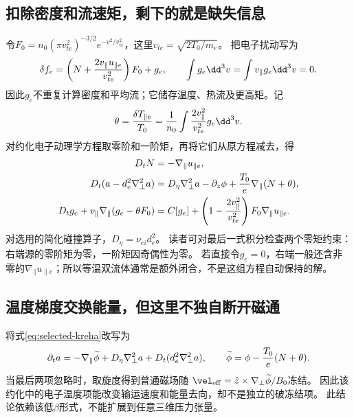 \subsection{扣除密度和流速矩，剩下的就是缺失信息}
令$F_0=n_0(\pi v_{te}^2)^{-3/2}e^{-v^2/v_{te}^2}$，这里$v_{te}=\sqrt{2T_0/m_e}$。
把电子扰动写为
\begin{equation}
 \delta f_e=\left(N+{2v_\parallel u_{\parallel e}\over v_{te}^2}\right)F_0+g_e,
 \qquad\int g_e\dd^3v=\int v_\parallel g_e\dd^3v=0.
\end{equation}
因此$g_e$不重复计算密度和平均流；它储存温度、热流及更高矩。记
\begin{equation}
 \theta={\delta T_{\parallel e}\over T_0}
 ={1\over n_0}\int{2v_\parallel^2\over v_{te}^2}g_e\dd^3v.
\end{equation}
对约化电子动理学方程取零阶和一阶矩，再将它们从原方程减去，得
\begin{align}
 D_tN&=-\nabla_\parallel u_{\parallel e},\label{eq:selected-krehn}\\
 D_t(a-d_e^2\nabla_\perp^2a)&=D_\eta\nabla_\perp^2a-\partial_z\phi
 +{T_0\over e}\nabla_\parallel(N+\theta),\label{eq:selected-kreha}\\
 D_tg_e+v_\parallel\nabla_\parallel(g_e-\theta F_0)
 &=C[g_e]+\left(1-{2v_\parallel^2\over v_{te}^2}\right)
 F_0\nabla_\parallel u_{\parallel e}.\label{eq:selected-krehg}
\end{align}
对选用的简化碰撞算子，$D_\eta=\nu_{ei}d_e^2$。
读者可对最后一式积分检查两个零矩约束：右端源的零阶矩为零，一阶矩因奇偶性为零。
若直接令$g_e=0$，右端一般还含非零的$\nabla_\parallel u_{\parallel e}$；所以等温双流体通常是额外闭合，不是这组方程自动保持的解。

\subsection{温度梯度交换能量，但这里不独自断开磁通}
将式\eqref{eq:selected-kreha}改写为
\begin{equation}
 \partial_ta=-\nabla_\parallel\widetilde\phi
 +D_\eta\nabla_\perp^2a+D_t(d_e^2\nabla_\perp^2a),\qquad
 \widetilde\phi=\phi-{T_0\over e}(N+\theta).
\end{equation}
当最后两项忽略时，取旋度得到普通磁场随
$\vel_{\rm eff}=\hat z\times\nabla_\perp\widetilde\phi/B_0$冻结。
因此该约化中的电子温度项能改变输运速度和能量去向，却不是独立的破冻结项。
此结论依赖该低$\beta$形式，不能扩展到任意三维压力张量。

